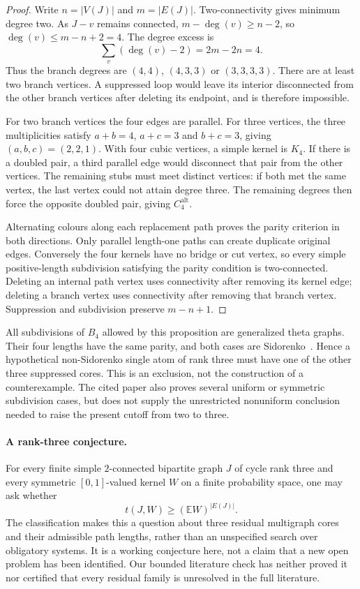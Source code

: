 \begin{proof}
Write $n=|V(J)|$ and $m=|E(J)|$.  Two-connectivity gives minimum degree
two.  As $J-v$ remains connected, $m-\deg(v)\ge n-2$, so
$\deg(v)\le m-n+2=4$.  The degree excess is
\[
 \sum_v(\deg(v)-2)=2m-2n=4.
\]
Thus the branch degrees are $(4,4)$, $(4,3,3)$ or $(3,3,3,3)$.
There are at least two branch vertices.  A suppressed loop would leave
its interior disconnected from the other branch vertices after deleting
its endpoint, and is therefore impossible.

For two branch vertices the four edges are parallel.  For three vertices,
the three multiplicities satisfy $a+b=4$, $a+c=3$ and $b+c=3$, giving
$(a,b,c)=(2,2,1)$.  With four cubic vertices, a simple kernel is $K_4$.
If there is a doubled pair, a third parallel edge would disconnect that
pair from the other vertices.  The remaining stubs must meet distinct
vertices: if both met the same vertex, the last vertex could not attain
degree three.  The remaining degrees then force the opposite doubled
pair, giving $C_4^{\mathrm{alt}}$.

Alternating colours along each replacement path proves the parity
criterion in both directions.  Only parallel length-one paths can create
duplicate original edges.  Conversely the four kernels have no bridge
or cut vertex, so every simple positive-length subdivision satisfying
the parity condition is two-connected.  Deleting an internal path vertex
uses connectivity after removing its kernel edge; deleting a branch
vertex uses connectivity after removing that branch vertex.  Suppression
and subdivision preserve $m-n+1$.
\end{proof}

All subdivisions of $B_4$ allowed by this proposition are generalized
theta graphs.  Their four lengths have the same parity, and both cases
are Sidorenko~\citep[Theorem~1.3 and Proposition~4.3]{imliliu2024}.
Hence a hypothetical non-Sidorenko single atom of rank three must have
one of the other three suppressed cores.  This is an exclusion, not the
construction of a counterexample.  The cited paper also proves several
uniform or symmetric subdivision cases, but does not supply the
unrestricted nonuniform conclusion needed to raise the present cutoff
from two to three.

\paragraph{A rank-three conjecture.}
For every finite simple $2$-connected bipartite graph $J$ of cycle rank
three and every symmetric $[0,1]$-valued kernel $W$ on a finite probability
space, one may ask whether
\[
 t(J,W)\ge (\mathbb E W)^{|E(J)|}.
\]
The classification makes this a question about three residual
multigraph cores and their admissible path lengths, rather than an
unspecified search over obligatory systems.  It is a working conjecture
here, not a claim that a new open problem has been identified.  Our
bounded literature check has neither proved it nor certified that every
residual family is unresolved in the full literature.

